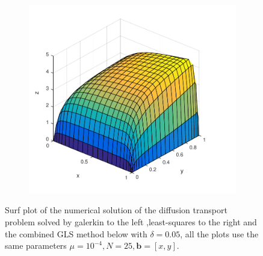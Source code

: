 \begin{figure}[h!]
\begin{subfigure}[b]{0.48\textwidth}
  \end{subfigure}
  \begin{subfigure}[b]{0.48\textwidth}
	\includegraphics[width=\textwidth]{Figures/SpecGLS_difftrans_aPos.pdf}
  \end{subfigure}
  \vspace{-0.1\baselineskip}
  \caption{Surf plot of the numerical solution of the diffusion transport problem solved by galerkin to the left ,least-squares to the right and the combined GLS method below with $\delta = 0.05$, all the plots use the same parameters $\mu = 10^{-4}, N=25,\mathbf{b} = [x,y]$.}
  \label{fig:SurfDiffTransPositive}
\end{figure}
%
%
